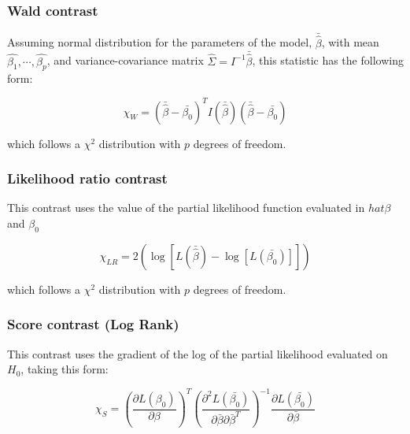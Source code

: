 \documentclass[11pt]{book} %
\begin{document}
      \subsubsection{Wald contrast}

        Assuming normal distribution for the parameters of the model, $\bar{\hat{\beta}}$, with mean $\hat{\beta_1},\cdots,\hat{\beta_p}$, and variance-covariance matrix $\hat{\Sigma} = I^{-1}\bar{\hat{\beta}}$, this statistic has the following form:

        \begin{equation}
          \chi_W = (\bar{\hat{\beta}} - \bar{\beta_0})^TI(\bar{\hat{\beta}})(\bar{\hat{\beta}} - \bar{\beta_0})
          \label{eq:cox-wald-contrast}
        \end{equation}

        which follows a $\chi^2$ distribution with $p$ degrees of freedom.

      \subsubsection{Likelihood ratio contrast}

        This contrast uses the value of the partial likelihood function evaluated in $hat{\beta}$ and $\beta_0$

        \begin{equation}
          \chi_{LR} = 2\left(\log[L(\bar{\hat{\beta}}) -  \log[L(\bar{\beta_0})]]\right)
          \label{eq:cox-lr-contrast}
        \end{equation}

        which follows a $\chi^2$ distribution with $p$ degrees of freedom.

      \subsubsection{Score contrast (Log Rank)}

        This contrast uses the gradient of the log of the partial likelihood evaluated on $H_0$, taking this form:

        \begin{equation}
          \chi_{S} = \left( \frac{\partial L(\beta_0)}{\partial \beta} \right)^T \left( \frac{\partial^2L(\bar{\beta_0})}{\partial\bar{\beta} \partial\bar{\beta}^T} \right)^{-1} \frac{\partial L(\bar{\beta_0})}{\partial\bar{\beta}}
          \label{eq:cox-score-contrast}
        \end{equation}
\end{document}
